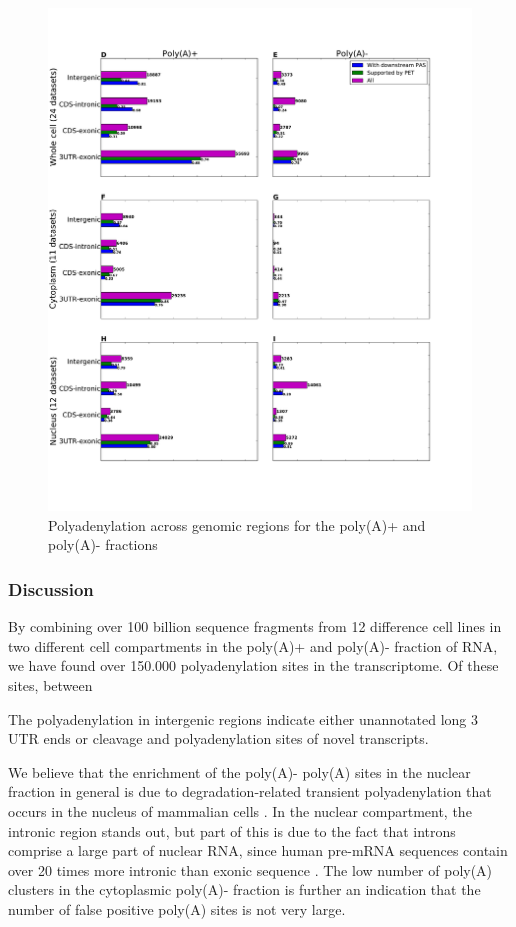\begin{figure}[htb]
	\begin{center}
		\includegraphics[scale=0.4]{figures/polyadenylation/Sidebars_pA_2+.pdf}
	\end{center}
	\caption{Polyadenylation across genomic regions for the poly(A)+ and poly(A)-
	fractions}
	\label{fig:sidebars}
\end{figure}

\subsubsection{Discussion}
By combining over 100 billion sequence fragments from 12 difference cell lines
in two different cell compartments in the poly(A)+ and poly(A)- fraction of
RNA, we have found over 150.000 polyadenylation sites in the transcriptome. Of
these sites, between

The polyadenylation in intergenic regions indicate either unannotated long 3\p
UTR ends or cleavage and polyadenylation sites of novel transcripts.

We believe that the enrichment of the poly(A)- poly(A) sites in the nuclear
fraction in general is due to degradation-related transient polyadenylation
that occurs in the nucleus of mammalian cells \cite{lemay_nuclear_2010,
lacava_rna_2005, wyers_cryptic_2005}. In the nuclear compartment, the intronic
region stands out, but part of this is due to the fact that introns comprise a
large part of nuclear RNA, since human pre-mRNA sequences contain over 20 times
more intronic than exonic sequence \cite{venter_sequence_2001}. The low number
of poly(A) clusters in the cytoplasmic poly(A)- fraction is further an
indication that the number of false positive poly(A) sites is not very large.

